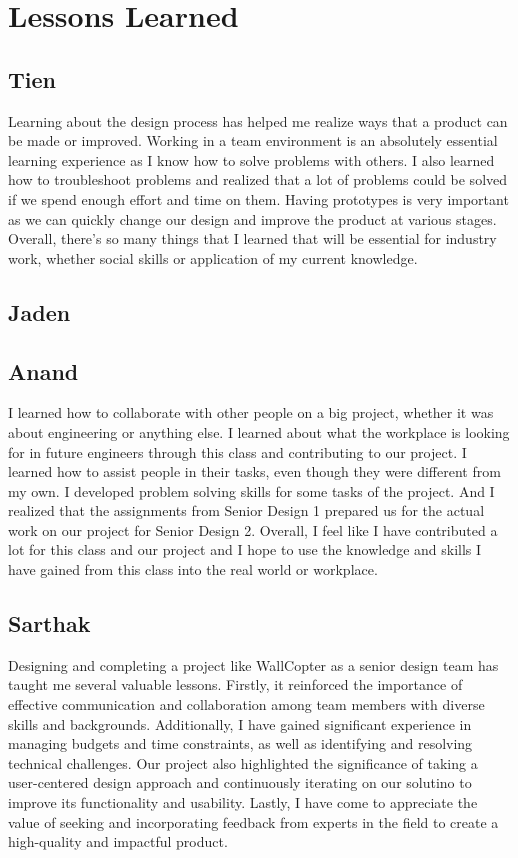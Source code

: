 \documentclass[12pt]{article}
\begin{document}
    \newpage
    \section{Lessons Learned}
        \subsection*{Tien}
            Learning about the design process has helped me realize ways that a product can be made or improved.
            Working in a team environment is an absolutely essential learning experience as I know how to solve problems with others.
            I also learned how to troubleshoot problems and realized that a lot of problems could be solved if we spend enough effort and time on them.
            Having prototypes is very important as we can quickly change our design and improve the product at various stages.
            Overall, there's so many things that I learned that will be essential for industry work, whether social skills or application of my current knowledge.
        
        \subsection*{Jaden}
        \subsection*{Anand}
            I learned how to collaborate with other people on a big project, whether it was about engineering or anything else.
            I learned about what the workplace is looking for in future engineers through this class and contributing to our project.
            I learned how to assist people in their tasks, even though they were different from my own.
            I developed problem solving skills for some tasks of the project.
            And I realized that the assignments from Senior Design 1 prepared us for the actual work on our project for Senior Design 2.
            Overall, I feel like I have contributed a lot for this class and our project and I hope to use the knowledge and skills I have gained from this class into the real world or workplace.

        \subsection*{Sarthak}
            Designing and completing a project like WallCopter as a senior design team has taught me several valuable lessons.
            Firstly, it reinforced the importance of effective communication and collaboration among team members with diverse skills and backgrounds.
            Additionally, I have gained significant experience in managing budgets and time constraints, as well as identifying and resolving technical challenges.
            Our project also highlighted the significance of taking a user-centered design approach and continuously iterating on our solutino to improve its functionality and usability.
            Lastly, I have come to appreciate the value of seeking and incorporating feedback from experts in the field to create a high-quality and impactful product.
\end{document}
